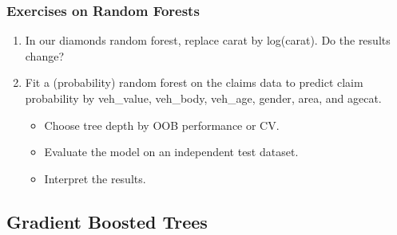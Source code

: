 \documentclass[
    utf8,
    aspectratio=169
]{beamer}  %
\begin{document}
\begin{frame}
	\frametitle{Exercises on Random Forests}
	\begin{enumerate}
		\item In our diamonds random forest, replace carat by log(carat). Do the results change?
		
		\vfill
		
		\item Fit a (probability) random forest on the claims data to predict claim probability by {\ttfamily veh\_value}, {\ttfamily veh\_body}, {\ttfamily veh\_age}, {\ttfamily gender}, {\ttfamily area}, and {\ttfamily agecat}.
		\begin{itemize}
			\item Choose tree depth by OOB performance or CV.
			\item Evaluate the model on an independent test dataset.
			\item Interpret the results.
		\end{itemize}
	\end{enumerate}
\end{frame}

\subsection{Gradient Boosted Trees}
\end{document}
